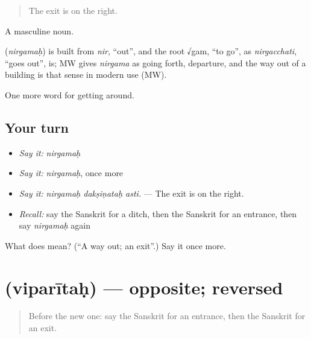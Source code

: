 \begin{quote}
The exit is on the right.
\end{quote}

A masculine noun.

\begin{cousinweb}
\textbf{} (\emph{nirgamaḥ}) is built from \emph{nir}, \textquotedblleft{}out\textquotedblright{}, and the root √gam, \textquotedblleft{}to go\textquotedblright{}, as \emph{nirgacchati}, \textquotedblleft{}goes out\textquotedblright{}, is; MW gives \emph{nirgama} as going forth, departure, and the way out of a building is that sense in modern use (MW).
\end{cousinweb}

\begin{grammarlens}[title={What you've built}]
One more word for getting around.
\end{grammarlens}

\subsection*{Your turn}
\begin{itemize}
\raggedright
  \item \emph{Say it:} \emph{nirgamaḥ}
  \item \emph{Say it:} \emph{nirgamaḥ}, once more
  \item \emph{Say it:} \emph{nirgamaḥ dakṣiṇataḥ asti.} — The exit is on the right.
  \item \emph{Recall:} say the Sanskrit for a ditch, then the Sanskrit for an entrance, then say \emph{nirgamaḥ} again
\end{itemize}

\begin{tcolorbox}[breakable,colback=teal!4,colframe=teal!35!black,title={Before you move on}]
What does  mean? (\textquotedblleft{}A way out; an exit\textquotedblright{}.) Say it once more.
\end{tcolorbox}
\section[\texorpdfstring{\sk{विपरीतः} (viparītaḥ)}{विपरीतः (viparītaḥ)}]{ (viparītaḥ) — opposite; reversed}

\label{lesson:SA-C423-viparitah}



\begin{quote}
Before the new one: say the Sanskrit for an entrance, then the Sanskrit for an exit.
\end{quote}

